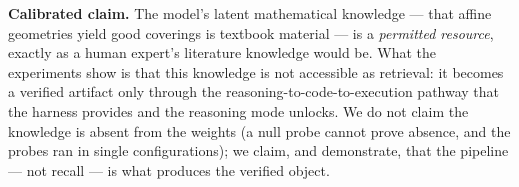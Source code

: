 \textbf{Calibrated claim.} The model's latent mathematical
knowledge --- that affine geometries yield good coverings is textbook
material --- is a \emph{permitted resource}, exactly as a human
expert's literature knowledge would be. What the experiments show is
that this knowledge is not accessible as retrieval: it becomes a
verified artifact only through the reasoning-to-code-to-execution
pathway that the harness provides and the reasoning mode unlocks. We
do not claim the knowledge is absent from the weights (a null probe
cannot prove absence, and the probes ran in single configurations);
we claim, and demonstrate, that the pipeline --- not recall --- is
what produces the verified object.
